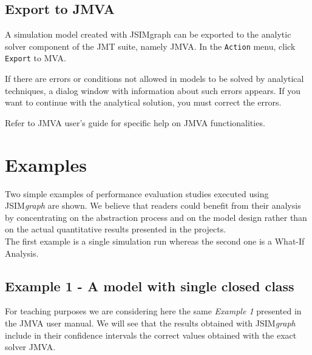 \subsection{Export to JMVA}
A simulation model created with JSIMgraph can be exported to the
analytic solver component of the JMT suite, namely JMVA. In the
\texttt{Action} menu, click \texttt{Export} to MVA.

If there are errors or conditions not allowed in models to be
solved by analytical techniques, a dialog window with information
about such errors appears. If you want to continue with the
analytical solution, you must correct the errors.

Refer to JMVA user's guide for specific help on JMVA
functionalities.\\

\section{Examples}
Two simple examples of performance evaluation studies executed
using JSIM\emph{graph} are shown. We believe that readers could
benefit from their analysis by concentrating on the abstraction
process and on the model design rather than on the actual
quantitative results presented in the projects.\\
The first example is a single simulation run whereas the second
one is a What-If Analysis.

\subsection{Example 1 - A model with single closed class}
For teaching purposes we are considering here the same
\emph{Example 1} presented in the JMVA user manual. We will see
that the results obtained with JSIM\emph{graph} include in their
confidence intervals the correct values obtained with the exact
solver JMVA.\\


